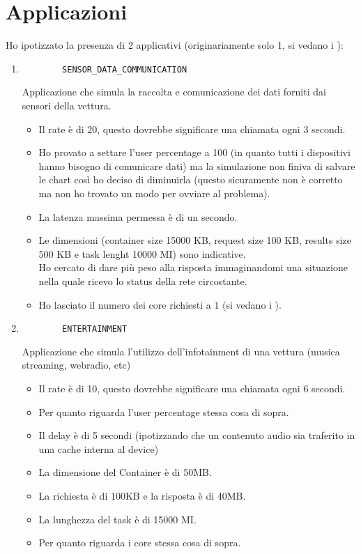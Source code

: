 \documentclass[12pt, a4paper]{report} %
\begin{document}
\section*{Applicazioni}
Ho ipotizzato la presenza di 2 applicativi (originariamente solo 1, si vedano i ):

\begin{enumerate}
\item
	\begin{verbatim}
		SENSOR_DATA_COMMUNICATION
	\end{verbatim}
	Applicazione che simula la raccolta e comunicazione dei dati forniti dai sensori della vettura.\\
	\begin{itemize}
	\item Il rate è di 20, questo dovrebbe significare una chiamata ogni 3 secondi.
	\item Ho provato a settare l'user percentage a 100 (in quanto tutti i dispositivi hanno bisogno di comunicare dati) ma la simulazione non finiva di salvare le chart così ho deciso di diminuirla (questo sicuramente non è corretto ma non ho trovato un modo per ovviare al problema).
	\item La latenza massima permessa è di un secondo.
	\item Le dimensioni (container size 15000 KB, request size 100 KB, results size 500 KB e task lenght 10000 MI) sono indicative.\\
	Ho cercato di dare più peso alla risposta immaginandomi una situazione nella quale ricevo lo status della rete circostante.
	\item Ho lasciato il numero dei core richiesti a 1 (si vedano i ).
	\end{itemize}
	\item
	\begin{verbatim}
		ENTERTAINMENT
	\end{verbatim}
	Applicazione che simula l'utilizzo dell'infotainment di una vettura (musica streaming, webradio, etc)
	\begin{itemize}
		\item Il rate è di 10, questo dovrebbe significare una chiamata ogni 6 secondi.
		\item Per quanto riguarda l'user percentage stessa cosa di sopra.
		\item Il delay è di 5 secondi (ipotizzando che un contenuto audio sia traferito in una cache interna al device)
		\item La dimensione del Container è di 50MB.
		\item La richiesta è di 100KB e la risposta è di 40MB.
		\item La lunghezza del task è di 15000 MI.
		\item Per quanto riguarda i core stessa cosa di sopra.
	\end{itemize}
\end{enumerate}
\end{document}
